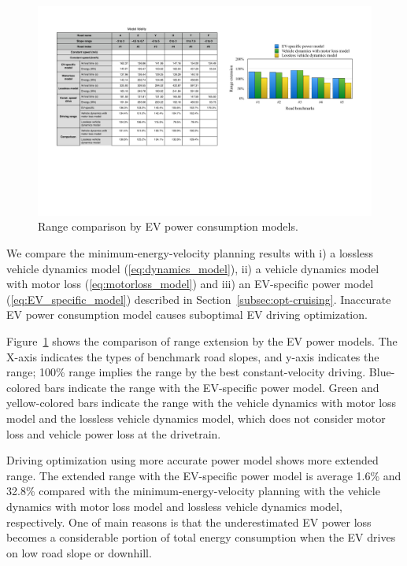 \documentclass{IEEEtran}
\begin{document}
\begin{figure}	 %
\centering
\includegraphics[width=\hsize]{Figures/model_fidelity.pdf}
\caption{Range comparison by EV power consumption models.}
\label{fig:energy_by_model}
\end{figure} 

We compare the minimum-energy-velocity planning results with i) a lossless vehicle dynamics model (\ref{eq:dynamics_model}), ii) a vehicle dynamics model with motor loss (\ref{eq:motorloss_model}) and iii) an EV-specific power model (\ref{eq:EV_specific_model}) described in Section~\ref{subsec:opt-cruising}. Inaccurate EV power consumption model causes suboptimal EV driving optimization.

Figure~\ref{fig:energy_by_model} shows the comparison of range extension by the EV power models. The X-axis indicates the types of benchmark road slopes, and y-axis indicates the range; 100\%  range implies the range by the best constant-velocity driving. Blue-colored bars indicate the range with the EV-specific power model. Green and yellow-colored bars indicate the range with the vehicle dynamics with motor loss model and the lossless vehicle dynamics model, which does not consider motor loss and vehicle power loss at the drivetrain.

Driving optimization using more accurate power model shows more extended range. The extended range with the EV-specific power model is average 1.6\% and 32.8\% compared with the minimum-energy-velocity planning with the vehicle dynamics with motor loss model and lossless vehicle dynamics model, respectively. One of main reasons is that the underestimated EV power loss becomes a considerable portion of total energy consumption when the EV drives on low road slope or downhill.
\end{document}
